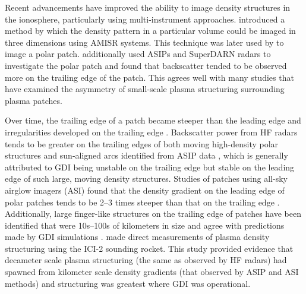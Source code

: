 Recent advancements have improved the ability to image density structures in the ionosphere, particularly using multi-instrument approaches.  \citet{Semeter2009} introduced a method by which the density pattern in a particular volume could be imaged in three dimensions using AMISR systems.  This technique was later used by \citet{Dahlgren2012a,Dahlgren2012b} to image a polar patch.  \citet{Dahlgren2012b} additionally used ASIPs and SuperDARN radars to investigate the polar patch and found that backscatter tended to be observed more on the trailing edge of the patch.  This agrees well with many studies that have examined the asymmetry of small-scale plasma structuring surrounding plasma patches.  

Over time, the trailing edge of a patch became steeper than the leading edge and irregularities developed on the trailing edge \citep{Weber1984}.  Backscatter power from HF radars tends to be greater on the trailing edges of both moving high-density polar structures \citep{Milan2002b} and sun-aligned arcs identified from ASIP data \citep{Koustov2012}, which is generally attributed to GDI being unstable on the trailing edge but stable on the leading edge of such large, moving density structures.  Studies of patches using all-sky airglow imagers (ASI) found that the density gradient on the leading edge of polar patches tends to be 2--3 times steeper than that on the trailing edge \citep{Hosokawa2016}.  Additionally, large finger-like structures on the trailing edge of patches have been identified that were 10s--100s of kilometers in size and agree with predictions made by GDI simulations \citep{Gondarenko2004b}.  \citet{Moen2012} made direct measurements of plasma density structuring using the ICI-2 sounding rocket.  This study provided evidence that decameter scale plasma structuring (the same as observed by HF radars) had spawned from kilometer scale density gradients (that observed by ASIP and ASI methods) and structuring was greatest where GDI was operational.

